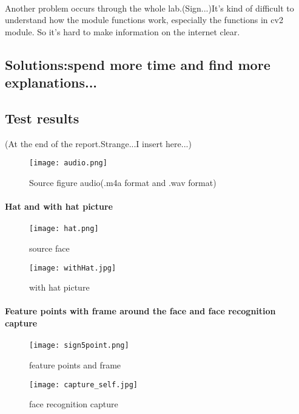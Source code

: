 \documentclass{article}
\begin{document}
		\paragraph{}Another problem occurs through the whole lab.(Sign...)It's kind of difficult to understand how the module functions work, especially the functions in cv2 module. So it's hard to make information on the internet clear. 
	\subsection{Solutions:spend more time and find more explanations...}
	\subsection{Test results}(At the end of the report.Strange...I insert here...)
	
   	\begin{figure}[h]
   	\centering
    	\texttt{[image: audio.png]}
	\caption{Source figure audio(.m4a format and .wav format)}
    	\end{figure}
	\paragraph{Hat and with hat picture}
	
	\begin{figure}[h]
	\begin{minipage}{0.49\linewidth}
	\centering
	\texttt{[image: hat.png]}
	\caption{source face}
	\label{Fig1}
	\end{minipage}
	\begin{minipage}{0.49\linewidth}
	\centering
	\texttt{[image: withHat.jpg]}
	\caption{with hat picture}
	\label{Fig2}
	\end{minipage}
	\end{figure}
	\paragraph{Feature points with frame around the face and face recognition capture}
	
	\begin{figure}[h]
	\begin{minipage}{0.49\linewidth}
	\centering
	\texttt{[image: sign5point.png]}
	\caption{feature points and frame}
	\label{Fig1}
	\end{minipage}
	\begin{minipage}{0.49\linewidth}
	\centering
	\texttt{[image: capture\_self.jpg]}
	\caption{face recognition capture}
	\label{Fig2}
	\end{minipage}
	\end{figure}
\end{document}
